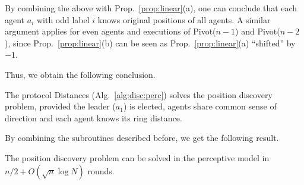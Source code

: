 By combining the above with Prop.~\ref{prop:linear}(a), one can conclude that each 
agent $a_i$ with odd label $i$ knows original positions of all agents. A similar argument
applies for even agents and executions of Pivot($n-1$) and Pivot($n-2$),
since Prop.~\ref{prop:linear}(b) can be seen as Prop.~\ref{prop:linear}(a) ``shifted'' by $-1$.

\iffull
Thus, we obtain the following conclusion.
\else
\fi
\begin{lemma}
The protocol Distances (Alg.~\ref{alg:disc:perc}) solves the position discovery problem, provided
the leader ($a_1$) is elected, agents share common sense of direction
and each agent knows its ring distance.
\end{lemma}

\iffull
By combining the subroutines described before, we get the following result.
\fi
\begin{theorem}
The position discovery problem can be solved in the perceptive model
in $n/2+O(\sqrt{n}\log N)$ rounds.
\end{theorem}

